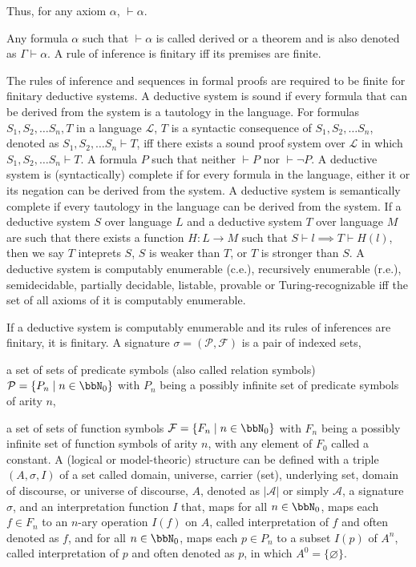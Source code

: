 \documentclass[a4paper,12pt]{article}
\begin{document}
Thus, for any axiom $\alpha$, $\vdash\alpha$.

Any formula $\alpha$ such that $\vdash\alpha$ is called derived or a theorem and is also denoted as $\Gamma\vdash\alpha$.
A rule of inference is finitary iff its premises are finite.

The rules of inference and sequences in formal proofs are required to be finite for finitary deductive systems.
A deductive system is sound if every formula that can be derived from the system is a tautology in the language.
For formulas $S_1,S_2,\ldots S_n,T$ in a language $\mathcal{L}$, $T$ is a syntactic consequence of $S_1,S_2,\ldots S_n$, denoted as $S_1,S_2,\ldots S_n\vdash T$, iff there exists a sound proof system over $\mathcal{L}$ in which $S_1,S_2,\ldots S_n\vdash T$.
A formula $P$ such that neither $\vdash P$ nor $\vdash\neg P$.
A deductive system is (syntactically) complete if for every formula in the language, either it or its negation can be derived from the system.
A deductive system is semantically complete if every tautology in the language can be derived from the system.
If a deductive system $S$ over language $L$ and a deductive system $T$ over language $M$ are such that there exists a function $H\colon L\to M$ such that $S\vdash l\implies T\vdash H(l)$, then we say $T$ inteprets $S$, $S$ is weaker than $T$, or $T$ is stronger than $S$.
A deductive system is computably enumerable (c.e.), recursively enumerable (r.e.), semidecidable, partially decidable, listable, provable or Turing-recognizable iff the set of all axioms of it is computably enumerable.

If a deductive system is computably enumerable and its rules of inferences are finitary, it is finitary.
A signature $\sigma=(\mathcal{P},\mathcal{F})$ is a pair of indexed sets,
\bit
\item a set of sets of predicate symbols (also called relation symbols) $\mathcal{P}=\{P_n\mid n\in\bbN_0\}$ with $P_n$ being a possibly infinite set of predicate symbols of arity $n$,
\item a set of sets of function symbols $\mathcal{F}=\{F_n\mid n\in\bbN_0\}$ with $F_n$ being a possibly infinite set of function symbols of arity $n$, with any element of $F_0$ called a constant.
\eit
{}
A (logical or model-theoric) structure can be defined with a triple $(A,\sigma,I)$ of a set called domain, universe, carrier (set), underlying set, domain of discourse, or universe of discourse, $A$, denoted as $|\mathcal{A}|$ or simply $\mathcal{A}$, a signature $\sigma$, and an interpretation function $I$ that, maps for all $n\in\bbN_0$, maps each $f\in F_n$ to an $n$-ary operation $I(f)$ on $A$, called interpretation of $f$ and often denoted as $f$, and for all $n\in\bbN_0$, maps each $p\in P_n$ to a subset $I(p)$ of $A^n$, called interpretation of $p$ and often denoted as $p$, in which $A^0=\{\varnothing\}$.
\end{document}
